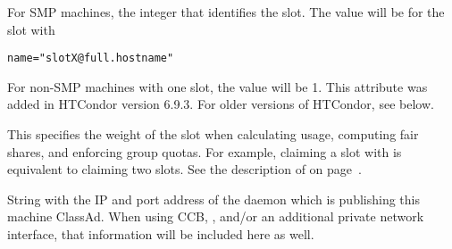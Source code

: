 \begin{description}
%
\item[\AdAttr{SlotID}:] For SMP machines, the integer
that identifies the slot.
The value will be \verb@X@ for the slot with 
\begin{verbatim}
name="slotX@full.hostname"
\end{verbatim}
For non-SMP machines with one slot, the value will be 1.
\Note This attribute was added in HTCondor version 6.9.3.
For older versions of HTCondor, see  below.
%
\item[\AdAttr{SlotWeight}:]
  This specifies the weight of the slot when
  calculating usage, computing fair shares, and enforcing group
  quotas.  For example, claiming a slot with  is
  equivalent to claiming two  slots.
  See the description of  on
  page~\pageref{param:SlotWeight}.

%
\item[\AdAttr{StartdIpAddr}:] String with the IP and port address of the
 daemon which is publishing this machine ClassAd.
When using CCB, , and/or an additional private
network interface, that information will be included here as well.


\end{description}
